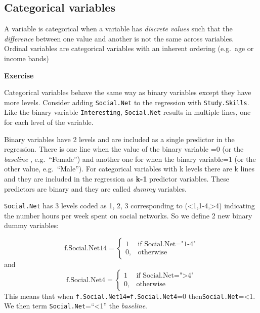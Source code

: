 \documentclass[
]{gitbook}
\begin{document}
\hypertarget{categorical-variables}{%
\subsection{Categorical variables}\label{categorical-variables}}

A variable is categorical when a variable has \emph{discrete values} such that the \emph{difference} between one value and another is not the same across variables. Ordinal variables are categorical variables with an inherent ordering (e.g.~age or income bands)

\textbf{Exercise}


Categorical variables behave the same way as binary variables except they have more levels. Consider adding \texttt{Social.Net} to the regression with \texttt{Study.Skills}. Like the binary variable \texttt{Interesting}, \texttt{Social.Net} results in multiple lines, one for each level of the variable.

Binary variables have 2 levels and are included as a single predictor in the regression. There is one line when the value of the binary variable =0 (or the \emph{baseline} , e.g.~``Female'') and another one for when the binary variable=1 (or the other value, e.g.~``Male''). For categorical variables with k levels there are k lines and they are included in the regression as \textbf{k-1} predictor variables. These predictors are binary and they are called \emph{dummy} variables.

\texttt{Social.Net} has 3 levels coded as 1, 2, 3 corresponding to (\textless1,1-4,\textgreater4) indicating the number hours per week spent on social networks. So we define 2 new binary dummy variables:

\[
    \text{f.Social.Net14}= 
\begin{cases}
    1 & \text{if Social.Net="1-4"}\\
    0,              & \text{otherwise}
\end{cases}
\]
and
\[
    \text{f.Social.Net4}= 
\begin{cases}
    1 & \text{if Social.Net=">4"}\\
    0,              & \text{otherwise}
\end{cases}
\]
This means that when \texttt{f.Social.Net14=f.Social.Net4}=0 then\texttt{Social.Net}=\textless1. We then term \texttt{Social.Net}=``\textless1'' the \emph{baseline}.
\end{document}
